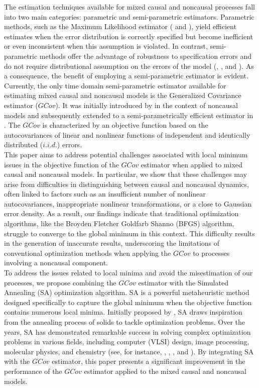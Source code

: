 \documentclass[<1p>]{elsarticle} %
\begin{document}
\indent The estimation techniques available for mixed causal and noncausal processes fall into two main categories: parametric and semi-parametric estimators. Parametric methods, such as the Maximum Likelihood estimator (\cite{lanne2013noncausal} and \cite{davis2020noncausal}), yield efficient estimates when the error distribution is correctly specified but become inefficient or even inconsistent when this assumption is violated. In contrast, semi-parametric methods offer the advantage of robustness to specification errors and do not require distributional assumption on the errors of the model (\cite{gourieroux2017noncausal}, \cite{gourieroux2022generalized}, and \cite{hecq2022spectral}). As a consequence, the benefit of employing a semi-parametric estimator is evident. Currently, the only time domain semi-parametric estimator available for estimating mixed causal and noncausal models is the Generalized Covariance estimator ($GCov$). It was initially introduced by \cite{gourieroux2017noncausal} in the context of noncausal models and subsequently extended to a semi-parametrically efficient estimator in \cite{gourieroux2022generalized}. The $GCov$ is characterized by an objective function based on the autocovariances of linear and nonlinear functions of independent and identically distributed ($i.i.d.$) errors.\\
\indent This paper aims to address potential challenges associated with local minimum issues in the objective function of the $GCov$ estimator when applied to mixed causal and noncausal models. In particular, we show that these challenges may arise from difficulties in distinguishing between causal and noncausal dynamics, often linked to factors such as an insufficient number of nonlinear autocovariances, inappropriate nonlinear transformations, or a close to Gaussian error density. As a result, our findings indicate that traditional optimization algorithms, like the Broyden Fletcher Goldfarb Shanno (BFGS) algorithm, struggle to converge to the global minimum in this context. This difficulty results in the generation of inaccurate results, underscoring the limitations of conventional optimization methods when applying the $GCov$ to processes involving a noncausal component.\\
\indent To address the issues related to local minima and avoid the misestimation of our processes, we propose combining the $GCov$ estimator with the Simulated Annealing (SA) optimization algorithm. SA is a powerful metaheuristic method designed specifically to capture the global minimum when the objective function contains numerous local minima. Initially proposed by \cite{kirkpatrick1983optimization}, SA draws inspiration from the annealing process of solids to tackle optimization problems. Over the years, SA has demonstrated remarkable success in solving complex optimization problems in various fields, including computer (VLSI) design, image processing, molecular physics, and chemistry (see, for instance, \cite{wong2012simulated}, \cite{carnevali1987image}, \cite{jones1991molecular}, and \cite{pannetier1990prediction}). By integrating SA with the $GCov$ estimator, this paper presents a significant improvement in the performance of the $GCov$ estimator applied to the mixed causal and noncausal models. \\
\end{document}
